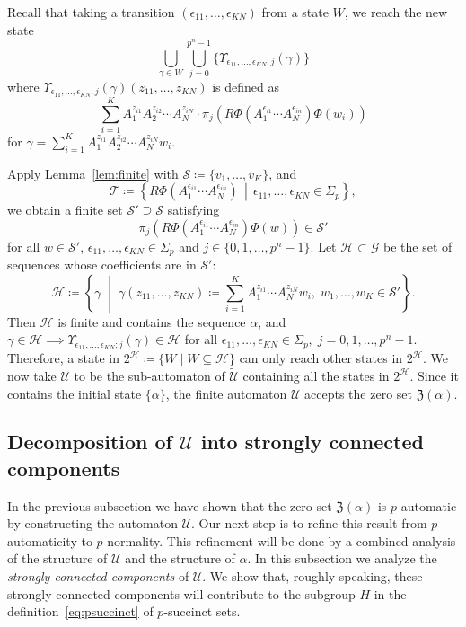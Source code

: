 \documentclass[letterpaper, 11pt, thm-restate]{article}
\numberwithin{equation}{section}
\newcommand{\mG}{\mathcal{G}}
\newcommand{\mT}{\mathcal{T}}
\newcommand{\mS}{\mathcal{S}}
\newcommand{\mH}{\mathcal{H}}
\newcommand{\mZ}{\mathfrak{Z}}
\newcommand{\mmU}{\mathscr{U}}
\newcommand{\tU}{\widetilde{\mathscr{U}}}
\theoremstyle{definition}
\theoremstyle{definition}
\theoremstyle{definition}
\begin{document}
Recall that taking a transition $(\epsilon_{11}, \ldots, \epsilon_{KN})$ from a state $W$, we reach the new state
\[
    \bigcup_{\gamma \in W} \bigcup_{j = 0}^{p^n - 1} \big\{\Upsilon_{\epsilon_{11}, \ldots, \epsilon_{KN}; j}(\gamma)\big\}
\]
where $\Upsilon_{\epsilon_{11}, \ldots, \epsilon_{KN}; j}(\gamma)(z_{11}, \ldots, z_{KN})$ is defined as
\begin{equation*}
    \sum_{i=1}^K A_1^{z_{i1}} A_2^{z_{i2}} \cdots A_N^{z_{iN}} \cdot \pi_j\left(R\Phi(A_1^{\epsilon_{i1}} \cdots A_N^{\epsilon_{in}}) \Phi(w_i)\right)
\end{equation*}
for $\gamma = \sum_{i = 1}^K A_1^{z_{i1}} A_2^{z_{i2}} \cdots A_N^{z_{iN}} w_i$.

Apply Lemma~\ref{lem:finite} with $\mS \coloneqq \{v_1, \ldots, v_K\}$, and
\[
\mT \coloneqq \left\{R \Phi(A_1^{\epsilon_{i1}} \cdots A_N^{\epsilon_{in}}) \,\middle|\, \epsilon_{11}, \ldots, \epsilon_{KN} \in \Sigma_p \right\},
\]
we obtain a finite set $\mS' \supseteq \mS$ satisfying
\begin{equation}\label{eq:pisins}
\pi_j\left(R\Phi(A_1^{\epsilon_{i1}} \cdots A_N^{\epsilon_{in}}) \Phi(w)\right) \in \mS'
\end{equation}
for all $w \in \mS'$, $\epsilon_{11}, \ldots, \epsilon_{KN} \in \Sigma_p$ and $j \in \{0, 1, \ldots, p^n - 1\}$.
Let $\mH \subset \mG$ be the set of sequences whose coefficients are in $\mS'$:
\[
    \mH \coloneqq \left\{\gamma \;\middle|\; \gamma(z_{11}, \ldots, z_{KN}) \coloneqq \sum_{i = 1}^K A_1^{z_{i1}} \cdots A_{N}^{z_{iN}} w_i,\; w_1, \ldots, w_K \in \mS' \right\}.
\]
Then $\mH$ is finite and contains the sequence $\alpha$, and $\gamma \in \mH \implies \Upsilon_{\epsilon_{11}, \ldots, \epsilon_{KN}; j}(\gamma) \in \mH$ for all $\epsilon_{11}, \ldots, \epsilon_{KN} \in \Sigma_p,\; j = 0, 1, \ldots, p^n -1$. 
Therefore, a state in $2^{\mH} \coloneqq \{W \mid W \subseteq \mH\}$ can only reach other states in $2^{\mH}$.
We now take $\mmU$ to be the sub-automaton of $\tU$ containing all the states in $2^{\mH}$.
Since it contains the initial state $\{\alpha\}$, the finite automaton $\mmU$ accepts the zero set $\mZ(\alpha)$.

\subsection{Decomposition of $\mmU$ into strongly connected components}\label{subsec:strongconn}
In the previous subsection we have shown that the zero set $\mZ(\alpha)$ is $p$-automatic by constructing the automaton $\mmU$.
Our next step is to refine this result from $p$-automaticity to $p$-normality.
This refinement will be done by a combined analysis of the structure of $\mmU$ and the structure of $\alpha$.
In this subsection we analyze the \emph{strongly connected components} of $\mmU$.
We show that, roughly speaking, these strongly connected components will contribute to the subgroup $H$ in the definition~\eqref{eq:psuccinct} of $p$-succinct sets.
\end{document}
